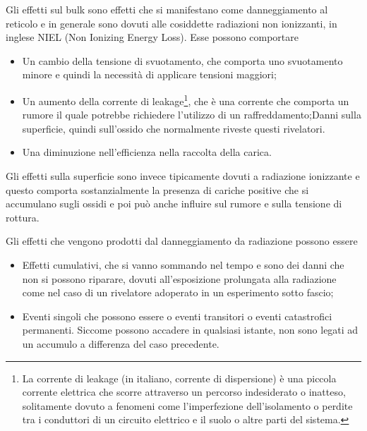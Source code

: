 Gli effetti sul bulk sono effetti che si manifestano come danneggiamento al reticolo e in generale sono dovuti alle cosiddette radiazioni non ionizzanti, in inglese NIEL (Non Ionizing Energy Loss). Esse possono comportare
\begin{itemize}[leftmargin=0.5cm]
   \item Un cambio della tensione di svuotamento, che comporta uno svuotamento minore e quindi la necessità di applicare tensioni maggiori;
   \item Un aumento della corrente di leakage\footnote{La corrente di leakage (in italiano, corrente di dispersione) è una piccola corrente elettrica che scorre attraverso un percorso indesiderato o inatteso, solitamente dovuto a fenomeni come l'imperfezione dell'isolamento o perdite tra i conduttori di un circuito elettrico e il suolo o altre parti del sistema.}, che è una corrente che comporta un rumore il quale potrebbe richiedere l'utilizzo di un raffreddamento;Danni sulla superficie, quindi sull'ossido che normalmente riveste questi rivelatori.
   \item Una diminuzione nell'efficienza nella raccolta della carica.
\end{itemize}


Gli effetti sulla superficie sono invece tipicamente dovuti a radiazione ionizzante e questo comporta sostanzialmente la presenza di cariche positive che si accumulano sugli ossidi e poi può anche influire sul rumore e sulla tensione di rottura.

Gli effetti che vengono prodotti dal danneggiamento da radiazione possono essere
\begin{itemize}[leftmargin=0.5cm]
   \item Effetti cumulativi, che si vanno sommando nel tempo e sono dei danni che non si possono riparare, dovuti all'esposizione prolungata alla radiazione come nel caso di un rivelatore adoperato in un esperimento sotto fascio;
   \item Eventi singoli che possono essere o eventi transitori o eventi catastrofici permanenti. Siccome possono accadere in qualsiasi istante, non sono legati ad un accumulo a differenza del caso precedente.
\end{itemize}

